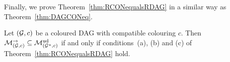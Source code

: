 Finally, we prove Theorem~\ref{thm:RCONequalsRDAG} in a similar way as Theorem~\ref{thm:DAGCONeq}.

\begin{prop} \label{prop:RDAGinRCON}
	Let $(\mathcal{G},c)$ be a coloured DAG with compatible colouring $c$. Then $\mathcal{M}_{(\mathcal{G}, c)}^{\to} \subseteq \mathcal{M}^{\mathrm{ud}}_{(\mathcal{G}^u, c)}$ if and only if conditions~(a), (b) and (c) of Theorem~\ref{thm:RCONequalsRDAG} hold.
\end{prop}


